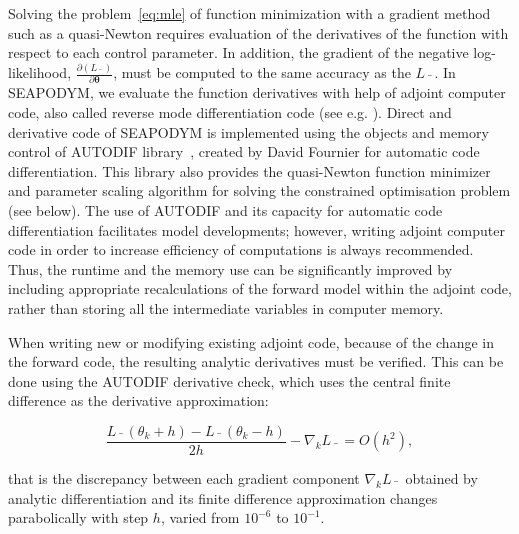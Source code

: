 Solving the problem~\ref{eq:mle} of function minimization with a gradient method such as a quasi-Newton requires evaluation of the derivatives of the function with respect to each control parameter. In addition, the gradient of the negative log-likelihood, $\frac{\partial (L\bar{\text{ }})}{\partial \boldsymbol \theta}$, must be computed to the same accuracy as the $L\bar{\text{ }}$. In SEAPODYM, we evaluate the function derivatives with help of adjoint computer code, also called reverse mode differentiation code (see e.g. \citet{Griewank}). Direct and derivative code of SEAPODYM is implemented using the objects and memory control of AUTODIF library~\citep{Autodif}, created by David Fournier \citep{Fournier} for automatic code differentiation. This library also provides  the quasi-Newton function minimizer and parameter scaling algorithm for solving the constrained optimisation problem (see below). The use of AUTODIF and its capacity for automatic code differentiation facilitates model developments; however, writing adjoint computer code in order to increase efficiency of computations is always recommended. Thus, the runtime and the memory use can be significantly improved by including appropriate recalculations of the forward model within the adjoint code, rather than storing all the intermediate variables in computer memory. 

When writing new or modifying existing adjoint code, because of the change in the forward code, the resulting analytic derivatives must be verified. This can be done using the AUTODIF derivative check, which uses the central finite difference as the derivative approximation:

\[\frac{L\bar{\text{ }}(\theta_k+h)-L\bar{\text{ }}(\theta_k-h)}{2h}
-\nabla_{k} L\bar{\text{ }}=O(h^2),  
\]

\noindent that is the discrepancy between each gradient component $\nabla_{k} L\bar{\text{ }}$ obtained by analytic differentiation and its finite difference approximation changes parabolically with step $h$, varied from $10^{-6}$ to $10^{-1}$.

